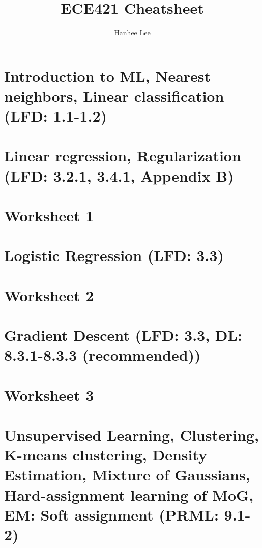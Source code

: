 \documentclass{article}
\title{ECE421 Cheatsheet}
\author{Hanhee Lee}
\begin{document}
\maketitle

\tableofcontents

\listoffigures

\listoftables

\section{Introduction to ML, Nearest neighbors, Linear classification (LFD: 1.1-1.2)}

\newpage

\section{Linear regression, Regularization (LFD: 3.2.1, 3.4.1, Appendix B)}

\newpage

\section{Worksheet 1}

\newpage

\section{Logistic Regression (LFD: 3.3)}

\newpage

\section{Worksheet 2}

\newpage

\section{Gradient Descent (LFD: 3.3, DL: 8.3.1-8.3.3 (recommended))}

\newpage

\section{Worksheet 3}

\newpage

\section{Unsupervised Learning, Clustering, K-means clustering, Density Estimation, Mixture of Gaussians, Hard-assignment learning of MoG, EM: Soft assignment (PRML: 9.1-2)}

\newpage
\end{document}
